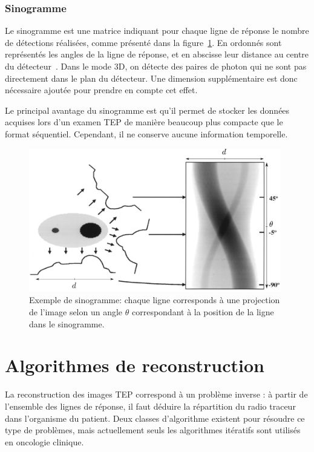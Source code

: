 		\subsection{Sinogramme}

Le sinogramme est une matrice indiquant pour chaque ligne de réponse le nombre de détections réalisées, comme présenté dans la figure~\ref{fig:sino}. En ordonnés sont représentés les angles de la ligne de réponse, et en abscisse leur distance au centre du détecteur~\cite{fahey2002data}. Dans le mode 3D, on détecte des paires de photon qui ne sont pas directement dans le plan du détecteur. Une dimension supplémentaire est donc nécessaire ajoutée pour prendre en compte cet effet.

Le principal avantage du sinogramme est qu'il permet de stocker les données acquises lors d'un examen TEP de manière beaucoup plus compacte que le format séquentiel. Cependant, il ne conserve aucune information temporelle.

\begin{figure}
\centering
\includegraphics[width=11cm]{images/sino}
\caption[Principe du sinogramme]{Exemple de sinogramme: chaque ligne corresponds à une projection de l'image selon un angle $\theta$ correspondant à la position de la ligne dans le sinogramme.}
\label{fig:sino}
\end{figure}


\chapter{Algorithmes de reconstruction}

La reconstruction des images TEP correspond à un problème inverse : à partir de l'ensemble des lignes de réponse, il faut déduire la répartition du radio traceur dans l'organisme du patient. Deux classes d'algorithme existent pour résoudre ce type de problèmes, mais actuellement seuls les algorithmes itératifs sont utilisés en oncologie clinique. 

